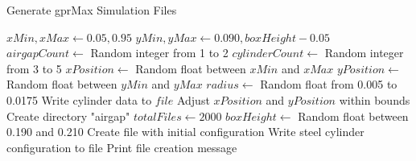 \begin{algorithm}
  \caption{Generate gprMax Simulation Files}
  \begin{algorithmic}[1]
      \State $xMin, xMax \gets 0.05, 0.95$
      \State $yMin, yMax \gets 0.090, boxHeight - 0.05$
      \State $airgapCount \gets$ Random integer from 1 to 2
          \State $cylinderCount \gets$ Random integer from 3 to 5
          \State $xPosition \gets$ Random float between $xMin$ and $xMax$
          \State $yPosition \gets$ Random float between $yMin$ and $yMax$
              \State $radius \gets$ Random float from 0.005 to 0.0175
              \State Write cylinder data to $file$
              \State Adjust $xPosition$ and $yPosition$ within bounds
          \EndFor
      \EndFor
  \EndFunction
  \State
      \State Create directory "airgap"
      \State $totalFiles \gets 2000$
          \State $boxHeight \gets$ Random float between 0.190 and 0.210
          \State Create file with initial configuration
          \State Write steel cylinder configuration to file
          \State {}
          \State Print file creation message
      \EndFor
  \EndFunction
  \end{algorithmic}
  \end{algorithm}

